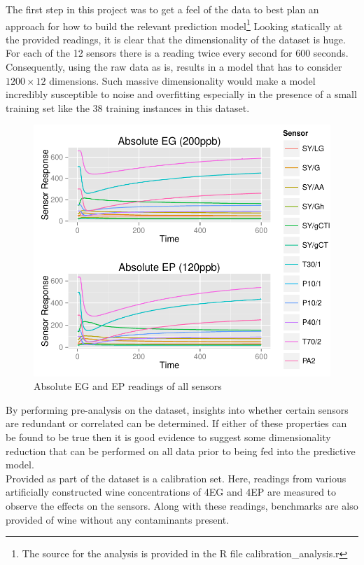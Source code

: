 \documentclass[twocolumn]{article}
\begin{document}
The first step in this project was to get a feel of the data to best plan an approach for how to
build the relevant prediction model\footnote{The source for the analysis is provided in the R file calibration\_analysis.r}
Looking statically at the provided readings, it is clear that the dimensionality of the dataset is huge. For each of the 12 sensors there 
is a reading twice every second for 600 seconds. Consequently, using the raw data as is, results in a model that has to consider $1200 \times 12$ 
dimensions. Such massive dimensionality would make a model incredibly susceptible to noise and 
overfitting especially in the presence of a small training set like the 38 training instances in this dataset. 
\begin{figure}[h!]
	\includegraphics[trim = 0mm 0mm 0mm 0mm, clip, scale=0.55]{absoluteEGEPreadings.pdf}
	\caption{Absolute EG and EP readings of all sensors}
	\label{fig:absoluteAnalyteReadings}
\end{figure}
By performing pre-analysis on the dataset, insights into whether certain sensors are
redundant or correlated can be determined. If either of these properties can be found to be true then it is good evidence to suggest some
dimensionality reduction that can be performed on all data prior to being fed into the predictive model. \\
Provided as part of the dataset is a calibration set. Here, readings from various artificially constructed wine 
concentrations of 4EG and 4EP are measured to observe the effects on the sensors. Along with these readings, benchmarks 
are also provided of wine without any contaminants present. 
\end{document}
